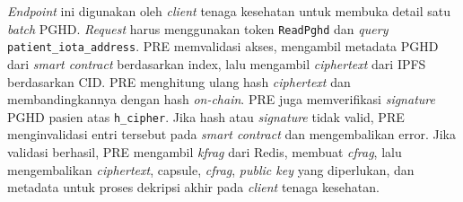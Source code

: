 \textit{Endpoint} ini digunakan oleh \textit{client} tenaga kesehatan untuk membuka detail satu \textit{batch} PGHD\@.
\textit{Request} harus menggunakan token \texttt{ReadPghd} dan \textit{query} \texttt{patient\_iota\_address}. 
PRE memvalidasi akses, mengambil metadata PGHD dari \textit{smart contract} berdasarkan index, lalu mengambil \textit{ciphertext} dari IPFS berdasarkan CID\@. 
PRE menghitung ulang hash \textit{ciphertext} dan membandingkannya dengan hash \textit{on-chain}. 
PRE juga memverifikasi \textit{signature} PGHD pasien atas \texttt{h\_cipher}. 
Jika hash atau \textit{signature} tidak valid, PRE menginvalidasi entri tersebut pada \textit{smart contract} dan mengembalikan error. 
Jika validasi berhasil, PRE mengambil \textit{kfrag} dari Redis, membuat \textit{cfrag}, lalu mengembalikan \textit{ciphertext}, capsule, \textit{cfrag}, \textit{public key} yang diperlukan, dan metadata untuk proses dekripsi akhir pada \textit{client} tenaga kesehatan.

